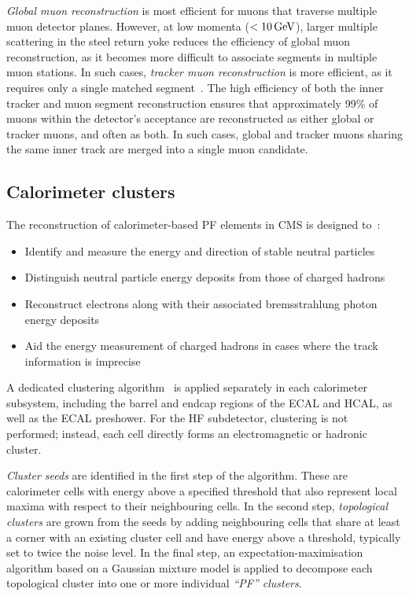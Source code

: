 \textit{Global muon reconstruction} is most efficient for muons that traverse multiple muon detector planes. However, at low momenta ($<10\,\text{Ge\hspace{-.08em}V}$), larger multiple scattering in the steel return yoke reduces the efficiency of global muon reconstruction, as it becomes more difficult to associate segments in multiple muon stations. In such cases, \textit{tracker muon reconstruction} is more efficient, as it requires only a single matched segment~\cite{CMS_Muon_System_Performance_2}. The high efficiency of both the inner tracker and muon segment reconstruction ensures that approximately 99\% of muons within the detector's acceptance are reconstructed as either global or tracker muons, and often as both.  In such cases, global and tracker muons sharing the same inner track are merged into a single muon candidate.

\subsection{Calorimeter clusters}

The reconstruction of calorimeter-based PF elements in \ac{CMS} is designed to~\cite{ParticleFlow}:

\begin{itemize}
    \item Identify and measure the energy and direction of stable neutral particles
    \item Distinguish neutral particle energy deposits from those of charged hadrons
    \item Reconstruct electrons along with their associated bremsstrahlung photon energy deposits
    \item Aid the energy measurement of charged hadrons in cases where the track information is imprecise
\end{itemize}

A dedicated clustering algorithm~\cite{ParticleFlow} is applied separately in each calorimeter subsystem, including the barrel and endcap regions of the \ac{ECAL} and \ac{HCAL}, as well as the \ac{ECAL} preshower. For the \ac{HF} subdetector, clustering is not performed; instead, each cell directly forms an electromagnetic or hadronic cluster. 

\textit{Cluster seeds} are identified in the first step of the algorithm. These are calorimeter cells with energy above a specified threshold that also represent local maxima with respect to their neighbouring cells. In the second step, \textit{topological clusters} are grown from the seeds by adding neighbouring cells that share at least a corner with an existing cluster cell and have energy above a threshold, typically set to twice the noise level. In the final step, an expectation-maximisation algorithm based on a Gaussian mixture model is applied to decompose each topological cluster into one or more individual \textit{``PF'' clusters}.

